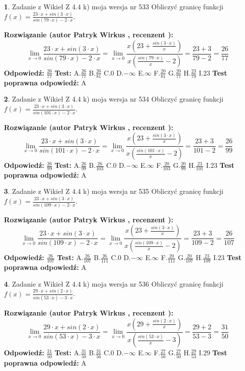 \documentclass[12pt, a4paper]{article}
\theoremstyle{definition} %
\newtheorem{zad}{}
\newcommand{\zadStart}[1]{\begin{zad}#1\newline}
\newcommand{\zadStop}{\end{zad}}
\newcommand{\rozwStart}[2]{\noindent \textbf{Rozwiązanie (autor #1 , recenzent #2): }\newline}
\newcommand{\rozwStop}{\newline}
\newcommand{\odpStart}{\noindent \textbf{Odpowiedź:}\newline}
\newcommand{\odpStop}{\newline}
\newcommand{\testStart}{\noindent \textbf{Test:}\newline}
\newcommand{\testStop}{\newline}
\newcommand{\kluczStart}{\noindent \textbf{Test poprawna odpowiedź:}\newline}
\newcommand{\kluczStop}{\newline}
\begin{document}
\zadStart{Zadanie z Wikieł Z 4.4 k) moja wersja nr 533}
Obliczyć granicę funkcji $f(x)=\frac{23\cdot x +sin(3\cdot x)}{sin(79\cdot x) -2\cdot x}$.
\zadStop
\rozwStart{Patryk Wirkus}{}
$$\lim\limits_{x\to 0}\frac{23\cdot x +sin(3\cdot x)}{sin(79\cdot x) -2\cdot x}
=\lim\limits_{x\to 0}\frac{x(23+\frac{sin(3\cdot x)}{x})}{x(\frac{sin(79\cdot x)}{x}-2)}
=\frac{23+3}{79-2} = \frac{26}{77}$$
\rozwStop
\odpStart
$\frac{26}{77}$
\odpStop
\testStart
A.$\frac{26}{77}$
B.$\frac{26}{81}$
C.$0$
D.$-\infty$
E.$\infty$
F.$\frac{20}{81}$
G.$\frac{20}{77}$
H.$\frac{23}{79}$
I.$23$
\testStop
\kluczStart
A
\kluczStop



\zadStart{Zadanie z Wikieł Z 4.4 k) moja wersja nr 534}
Obliczyć granicę funkcji $f(x)=\frac{23\cdot x +sin(3\cdot x)}{sin(101\cdot x) -2\cdot x}$.
\zadStop
\rozwStart{Patryk Wirkus}{}
$$\lim\limits_{x\to 0}\frac{23\cdot x +sin(3\cdot x)}{sin(101\cdot x) -2\cdot x}
=\lim\limits_{x\to 0}\frac{x(23+\frac{sin(3\cdot x)}{x})}{x(\frac{sin(101\cdot x)}{x}-2)}
=\frac{23+3}{101-2} = \frac{26}{99}$$
\rozwStop
\odpStart
$\frac{26}{99}$
\odpStop
\testStart
A.$\frac{26}{99}$
B.$\frac{26}{103}$
C.$0$
D.$-\infty$
E.$\infty$
F.$\frac{20}{103}$
G.$\frac{20}{99}$
H.$\frac{23}{101}$
I.$23$
\testStop
\kluczStart
A
\kluczStop



\zadStart{Zadanie z Wikieł Z 4.4 k) moja wersja nr 535}
Obliczyć granicę funkcji $f(x)=\frac{23\cdot x +sin(3\cdot x)}{sin(109\cdot x) -2\cdot x}$.
\zadStop
\rozwStart{Patryk Wirkus}{}
$$\lim\limits_{x\to 0}\frac{23\cdot x +sin(3\cdot x)}{sin(109\cdot x) -2\cdot x}
=\lim\limits_{x\to 0}\frac{x(23+\frac{sin(3\cdot x)}{x})}{x(\frac{sin(109\cdot x)}{x}-2)}
=\frac{23+3}{109-2} = \frac{26}{107}$$
\rozwStop
\odpStart
$\frac{26}{107}$
\odpStop
\testStart
A.$\frac{26}{107}$
B.$\frac{26}{111}$
C.$0$
D.$-\infty$
E.$\infty$
F.$\frac{20}{111}$
G.$\frac{20}{107}$
H.$\frac{23}{109}$
I.$23$
\testStop
\kluczStart
A
\kluczStop



\zadStart{Zadanie z Wikieł Z 4.4 k) moja wersja nr 536}
Obliczyć granicę funkcji $f(x)=\frac{29\cdot x +sin(2\cdot x)}{sin(53\cdot x) -3\cdot x}$.
\zadStop
\rozwStart{Patryk Wirkus}{}
$$\lim\limits_{x\to 0}\frac{29\cdot x +sin(2\cdot x)}{sin(53\cdot x) -3\cdot x}
=\lim\limits_{x\to 0}\frac{x(29+\frac{sin(2\cdot x)}{x})}{x(\frac{sin(53\cdot x)}{x}-3)}
=\frac{29+2}{53-3} = \frac{31}{50}$$
\rozwStop
\odpStart
$\frac{31}{50}$
\odpStop
\testStart
A.$\frac{31}{50}$
B.$\frac{31}{56}$
C.$0$
D.$-\infty$
E.$\infty$
F.$\frac{27}{56}$
G.$\frac{27}{50}$
H.$\frac{29}{53}$
I.$29$
\testStop
\kluczStart
A
\kluczStop
\end{document}
